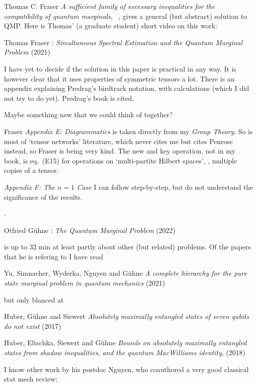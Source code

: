 \begin{description}
Thomas C. Fraser
{\em A sufficient family of necessary inequalities for the compatibility of quantum marginals}, 
,
gives a general (but abstract) solution to QMP. Here is
Thomas' (a graduate student) short video on this work:

 Thomas Fraser :
{\em Simultaneous Spectral Estimation and the Quantum Marginal Problem} (2021)

I have yet to decide if the solution in this paper is practical in any way.
It is however clear that it uses properties of symmetric tensors a lot. There
is an appendix explaining Predrag's birdtrack notation, with calculations
(which I did not try to do yet). Predrag's book is cited.

Maybe something new that we could think of together?

\item[2023-01-02 Predrag]
Fraser {\em Appendix E: Diagrammatics} is taken directly from my
{\em Group Theory}. So is most of `tensor networks' literature,
which never cites me but cites Penrose instead, so Fraser is being very kind.
The new and key operation, not in my book, is eq.~(E15) for operations on
`multi-partite Hilbert spaces', \ie, multiple copies of a tensor.

{\em Appendix F: The $n = 1$ Case} I can follow step-by-step, but do not
understand the significance of the results.

\item[2023-01-03 Erik].

 Otfried G{\"{u}}hne :
{\em The Quantum Marginal Problem} (2022)

is up to 32 min at least partly about other (but
related) problems. Of the papers that he is refering to I have read

Yu, Simnacher, Wyderka, Nguyen and G{\"{u}}hne
{\em A complete hierarchy for the pure state marginal problem in quantum mechanics}
(2021)

but only blanced at

Huber, G{\"{u}}hne and Siewert
{\em Absolutely maximally entangled states of seven qubits do not exist} (2017)

Huber, Eltschka, Siewert and G{\"{u}}hne
{\em Bounds on absolutely maximally entangled states from shadow
inequalities, and the quantum {MacWilliams} identity},
(2018)

I know other work by his postdoc
Nguyen, who coauthored a very good classical stat mech review;


\end{description}

